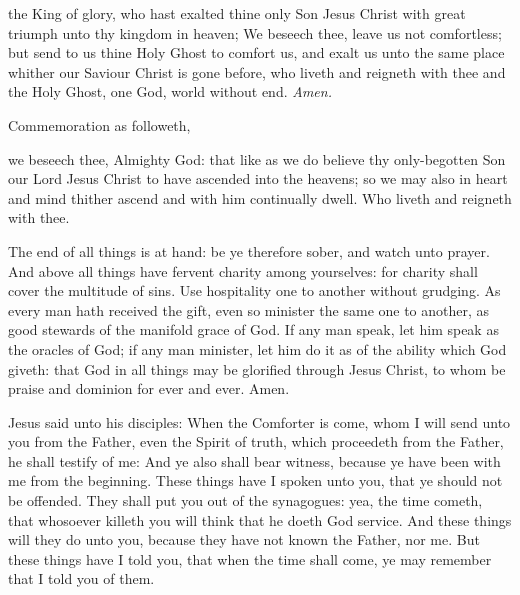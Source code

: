 \vspace{-0.25\baselineskip}

\collect

\vspace{-0.1\baselineskip}

 the King of glory, who hast exalted thine only Son Jesus Christ with great triumph unto thy kingdom in heaven; We beseech thee, leave us not comfortless; but send to us thine Holy Ghost to comfort us, and exalt us unto the same place whither our Saviour Christ is gone before, who liveth and reigneth with thee and the Holy Ghost, one God, world without end. \textit{Amen.}

\begin{rubric}
	Commemoration  as followeth,
\end{rubric}

 we beseech thee, Almighty God: that like as we do believe thy only-begotten Son our Lord Jesus Christ to have ascended into the heavens; so we may also in heart and mind thither ascend and with him continually dwell. Who liveth and reigneth with thee.

 The end of all things is at hand: be ye therefore sober, and watch unto prayer. And above all things have fervent charity among yourselves: for charity shall cover the multitude of sins. Use hospitality one to another without grudging. As every man hath received the gift, even so minister the same one to another, as good stewards of the manifold grace of God. If any man speak, let him speak as the oracles of God; if any man minister, let him do it as of the ability which God giveth: that God in all things may be glorified through Jesus Christ, to whom be praise and dominion for ever and ever. Amen.


 Jesus said unto his disciples: When the Comforter is come, whom I will send unto you from the Father, even the Spirit of truth, which proceedeth from the Father, he shall testify of me: And ye also shall bear witness, because ye have been with me from the beginning. These things have I spoken unto you, that ye should not be offended. They shall put you out of the synagogues: yea, the time cometh, that whosoever killeth you will think that he doeth God service. And these things will they do unto you, because they have not known the Father, nor me. But these things have I told you, that when the time shall come, ye may remember that I told you of them.

